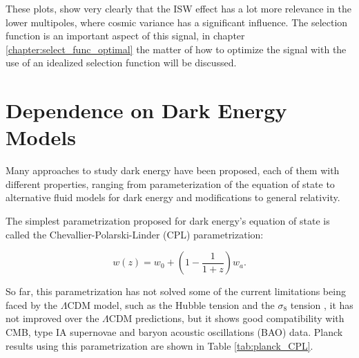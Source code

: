 \documentclass[openany,a4paper,12pt,oneside]{book}
\begin{document}
\begin{spacing}{1.5}
These plots, show very clearly that the ISW effect has a lot more relevance in the lower multipoles, where cosmic variance has a significant influence. The selection function is an important aspect of this signal, in chapter \ref{chapter:select_func_optimal} the matter of how to optimize the signal with the use of an idealized selection function will be discussed.

\section{Dependence on Dark Energy Models}\label{sect:dark_energy}

Many approaches to study dark energy have been proposed, each of them with different properties, ranging from parameterization of the equation of state\cite{CPL_DE_parametrization, FSLL_DE_parametrization} to alternative fluid models for dark energy\cite{DEDM_fluid} and modifications to general relativity\cite{Brane_cosmo_model}. 

The simplest parametrization proposed for dark energy's equation of state is called the Chevallier-Polarski-Linder (CPL) parametrization\cite{CPL_DE_parametrization,DE_models}:

\begin{equation}\label{CPL}
    w(z)=w_0+\left(1-\frac{1}{1+z}\right)w_a.
\end{equation}


So far, this parametrization has not solved some of the current limitations being faced by the $\Lambda$CDM model, such as the Hubble tension \cite{Hubble_tension_review} and the $\sigma_8$ tension \cite{Planck_results}, it has not improved over the $\Lambda$CDM predictions, but it shows good compatibility with CMB, type IA supernovae and baryon acoustic oscillations (BAO) data\cite{Planck_results}. Planck results using this parametrization are shown in Table \ref{tab:planck_CPL}.


\end{spacing}
\end{document}
